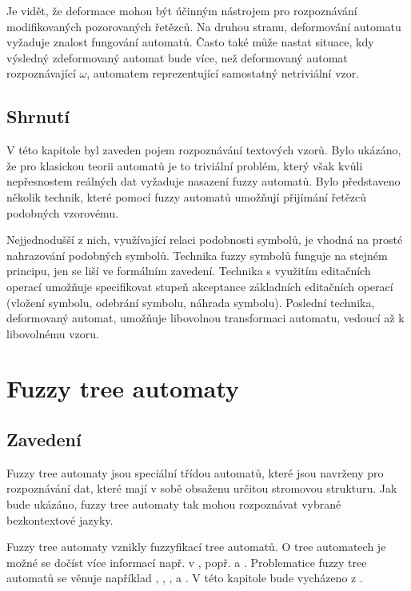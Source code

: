 \documentclass[a4paper,10pt]{article}
\begin{document}
Je vidět, že deformace mohou být účinným nástrojem pro rozpoznávání modifikovaných pozorovaných řetězců. Na druhou stranu, deformování automatu vyžaduje znalost fungování automatů. Často také může nastat situace, kdy výsledný zdeformovaný automat bude více, než deformovaný automat rozpoznávající $\omega$, automatem reprezentující samostatný netriviální vzor.

\subsection{Shrnutí}
V této kapitole byl zaveden pojem rozpoznávání textových vzorů. Bylo ukázáno, že pro klasickou teorii automatů je to triviální problém, který však kvůli nepřesnostem reálných dat vyžaduje nasazení fuzzy automatů. Bylo představeno několik technik, které pomocí fuzzy automatů umožňují přijímání řetězců podobných vzorovému. 

Nejjednodušší z nich, využívající relaci podobnosti symbolů, je vhodná na prosté nahrazování podobných symbolů. Technika fuzzy symbolů funguje na stejném principu, jen se liší ve formálním zavedení. Technika s využitím editačních operací umožňuje specifikovat stupeň akceptance základních editačních operací (vložení symbolu, odebrání symbolu, náhrada symbolu). Poslední technika, deformovaný automat, umožňuje libovolnou transformaci automatu, vedoucí až k libovolnému vzoru.

\newpage
\section{Fuzzy tree automaty}

\subsection{Zavedení}
Fuzzy tree automaty jsou speciální třídou automatů, které jsou navrženy pro rozpoznávání dat, které mají v sobě obsaženu určitou stromovou strukturu. Jak bude ukázáno, fuzzy tree automaty tak mohou rozpoznávat vybrané bezkontextové jazyky.

Fuzzy tree automaty vznikly fuzzyfikací  tree automatů. O  tree automatech je možné se dočíst více informací např. v \cite{Com+-TreeAutTecApp}, popř. \cite{Hua-SyntPattRecSeisOilExp} a \cite{Bez+-FuzModAlgPatRecImProc}. Problematice fuzzy tree automatů se věnuje například \cite{Lee-FuzTreAutSynPatRec}, \cite{MogZadAme-NewDirInFuzzTreeAut}, \cite{ChaJos-NoteFuzzTreeAut}, \cite{EsiLiu-FuzzTreeAut} a \cite{MorMal-FuzzyAutLang}. V této kapitole bude vycházeno z \cite{MorMal-FuzzyAutLang}.
\end{document}
